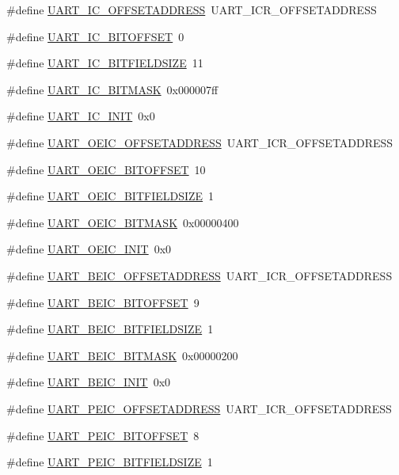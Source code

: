 \begin{DoxyCompactItemize}
\item 
\#define \hyperlink{a00575_a116f76b1f9185f17a77aec2d8a0ed0c1}{UART\_\-IC\_\-OFFSETADDRESS}~UART\_\-ICR\_\-OFFSETADDRESS
\item 
\#define \hyperlink{a00575_a55b75dd6c03b760f689b600ad5a16b77}{UART\_\-IC\_\-BITOFFSET}~0
\item 
\#define \hyperlink{a00575_a7e6aa79b0a67240ff8cb824cfdbc8853}{UART\_\-IC\_\-BITFIELDSIZE}~11
\item 
\#define \hyperlink{a00575_a5370c870f3543f45c172ec5e5405f527}{UART\_\-IC\_\-BITMASK}~0x000007ff
\item 
\#define \hyperlink{a00575_a0f09e5d4226012597ce64537edcd8ebd}{UART\_\-IC\_\-INIT}~0x0
\item 
\#define \hyperlink{a00575_ac9d223ca35aeaaf8db776904c5d88b13}{UART\_\-OEIC\_\-OFFSETADDRESS}~UART\_\-ICR\_\-OFFSETADDRESS
\item 
\#define \hyperlink{a00575_a169410e625dfab23c4e3f03e8f742438}{UART\_\-OEIC\_\-BITOFFSET}~10
\item 
\#define \hyperlink{a00575_acd134b85b067bdd13049d29c1185865b}{UART\_\-OEIC\_\-BITFIELDSIZE}~1
\item 
\#define \hyperlink{a00575_a568d1ed849a47facbeb5d209dbecd72b}{UART\_\-OEIC\_\-BITMASK}~0x00000400
\item 
\#define \hyperlink{a00575_abe77cd89dab6a6c599d7ff62ad857297}{UART\_\-OEIC\_\-INIT}~0x0
\item 
\#define \hyperlink{a00575_aa6db7d4e3bda5820d59533a1f7f82073}{UART\_\-BEIC\_\-OFFSETADDRESS}~UART\_\-ICR\_\-OFFSETADDRESS
\item 
\#define \hyperlink{a00575_adbd033a58f18ad5c2daa7fb505eaa813}{UART\_\-BEIC\_\-BITOFFSET}~9
\item 
\#define \hyperlink{a00575_ac54b9df8351604763558b41db2de7542}{UART\_\-BEIC\_\-BITFIELDSIZE}~1
\item 
\#define \hyperlink{a00575_a19408d010eeb356ceadbc9a502432fde}{UART\_\-BEIC\_\-BITMASK}~0x00000200
\item 
\#define \hyperlink{a00575_a2b4d7554b1990acf78be8df931cfbde1}{UART\_\-BEIC\_\-INIT}~0x0
\item 
\#define \hyperlink{a00575_a3c262023bb3338c6c818b4beff626291}{UART\_\-PEIC\_\-OFFSETADDRESS}~UART\_\-ICR\_\-OFFSETADDRESS
\item 
\#define \hyperlink{a00575_a50703869afe7e11e40ebf8031524d5ea}{UART\_\-PEIC\_\-BITOFFSET}~8
\item 
\#define \hyperlink{a00575_a29819b41b552d207b8925bf5f80951d0}{UART\_\-PEIC\_\-BITFIELDSIZE}~1

\end{DoxyCompactItemize}

